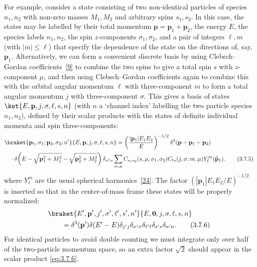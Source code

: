 For example, consider a state consisting of two non-identical particles of
species $n_1,n_2$ with non-zero masses $M_1,M_2$ and arbitrary spins $s_1,s_2$.
In this case, the states may be labelled by their total momentum
$\mathbf p=\mathbf p_1+\mathbf p_2$, the energy $E$, the species labels
$n_1,n_2$, the spin $z$-components $\sigma_1,\sigma_2$, and a pair of integers
$\ell,m$ (with $|m|\leq\ell$) that specify the dependence of the state on the
directions of, say, $\mathbf p_1$. Alternatively, we can form a convenient
discrete basis by using Clebsch--Gordan coefficients~\hyperref[ref:3.9]{[9]} to combine the two
spins to give a total spin $s$ with $z$-component $\mu$, and then using
Clebsch--Gordan coefficients again to combine this with the orbital angular
momentum $\ell$ with three-component $m$ to form a total angular momentum $j$
with three-component $\sigma$. This gives a basis of states
$\ket{E,\mathbf p,j,\sigma,\ell,s,n}$ (with $n$ a `channel index' labelling the
two particle species $n_1,n_2$), defined by their scalar products with the
states of definite individual momenta and spin three-components:
\begin{align}
  &\braket{\mathbf p_1,\sigma_1;\mathbf p_2,\sigma_2;n'}
           {E,\mathbf p,j,\sigma,\ell,s,n}
  =\left(\frac{|\mathbf p_1|E_1E_2}{E}\right)^{-1/2}
    \delta^3(\mathbf p-\mathbf p_1-\mathbf p_2) \notag\\
  &\quad\cdot
    \delta\!\left(E-\sqrt{\mathbf p_1^2+M_1^2}
                    -\sqrt{\mathbf p_2^2+M_2^2}\right)\delta_{n'n}
    \sum_{m,\mu}C_{s_1s_2}(s,\mu;\sigma_1,\sigma_2)
      C_{\ell s}(j,\sigma;m,\mu)Y_\ell^m(\widehat{\mathbf p}_1).
  \tag{3.7.5}\label{eq:3.7.5}
\end{align}
where $Y_\ell^m$ are the usual spherical harmonics~\hyperref[ref:3.24]{[24]}. The factor
$(|\mathbf p_1|E_1E_2/E)^{-1/2}$ is inserted so that in the center-of-mass
frame these states will be properly normalized:
\begin{align}
  &\braket{E',\mathbf p',j',\sigma',\ell',s',n'}
           {E,\mathbf 0,j,\sigma,\ell,s,n} \notag\\
  &\qquad=\delta^3(\mathbf p')\delta(E'-E)
    \delta_{j'j}\delta_{\sigma'\sigma}\delta_{\ell'\ell}
    \delta_{s's}\delta_{n'n}.
  \tag{3.7.6}\label{eq:3.7.6}
\end{align}
For identical particles to avoid double counting we must integrate only over
half of the two-particle momentum space, so an extra factor $\sqrt2$ should
appear in the scalar product \eqref{eq:3.7.6}.

